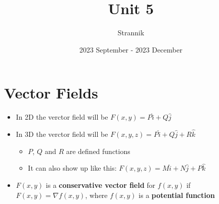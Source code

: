 \documentclass{article}
\title{Unit 5}
\author{Strannik}
\date{2023 September - 2023 December}
\begin{document}
\maketitle
\section{Vector Fields}
\begin{itemize}
  \item In 2D the verctor field will be $F(x,y) = P\hat{i} + Q\hat{j}$
  \item In 3D the verctor field will be $F(x,y,z) = P\hat{i} + Q\hat{j} + R\hat{k}$
  \begin{itemize}
    \item $P$, $Q$ and $R$ are defined functions
    \item It can also show up like this: $F(x,y,z) = M\hat{i} + N\hat{j} + P\hat{k}$
  \end{itemize}
  \item $F(x,y)$ is a \textbf{conservative vector field} for $f(x,y)$ if $F(x,y) = \nabla f(x,y)$, where $f(x,y)$ is a \textbf{potential function}
\end{itemize}
\end{document}

